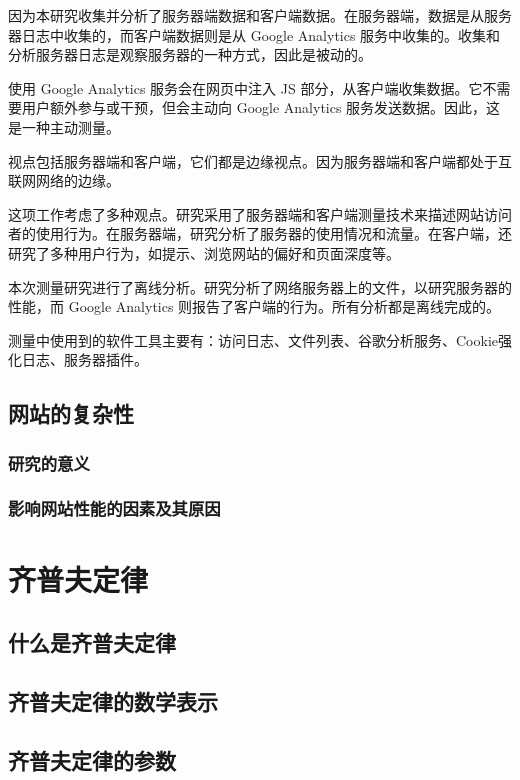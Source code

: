 因为本研究收集并分析了服务器端数据和客户端数据。在服务器端，数据是从服务器日志中收集的，而客户端数据则是从 Google Analytics 服务中收集的。收集和分析服务器日志是观察服务器的一种方式，因此是被动的。

使用 Google Analytics 服务会在网页中注入 JS 部分，从客户端收集数据。它不需要用户额外参与或干预，但会主动向 Google Analytics 服务发送数据。因此，这是一种主动测量。

视点包括服务器端和客户端，它们都是边缘视点。因为服务器端和客户端都处于互联网网络的边缘。

这项工作考虑了多种观点。研究采用了服务器端和客户端测量技术来描述网站访问者的使用行为。在服务器端，研究分析了服务器的使用情况和流量。在客户端，还研究了多种用户行为，如提示、浏览网站的偏好和页面深度等。

本次测量研究进行了离线分析。研究分析了网络服务器上的文件，以研究服务器的性能，而 Google Analytics 则报告了客户端的行为。所有分析都是离线完成的。

测量中使用到的软件工具主要有：访问日志、文件列表、谷歌分析服务、Cookie强化日志、服务器插件。
\section{网站的复杂性}

\subsection{研究的意义}

\subsection{影响网站性能的因素及其原因}

\chapter{齐普夫定律}

\section{什么是齐普夫定律}

\section{齐普夫定律的数学表示}

\section{齐普夫定律的参数}

